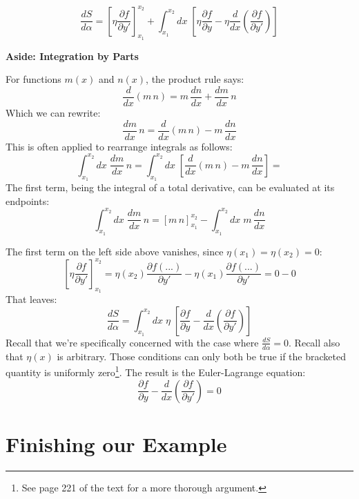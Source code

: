 \documentclass[10pt]{article}
\renewenvironment{quote}{\begin{shaded*}\begin{oldquote}}{\end{oldquote}\end{shaded*}}
\begin{document}
$$
\frac{dS}{d\alpha} = 
    \left[ \eta \frac{\partial f}{\partial y'} \right]_{x_1}^{x_2} + 
    \displaystyle\int_{x_1}^{x_2} dx \; \left[
    \eta \frac{\partial f}{\partial y} -
    \eta \frac{d}{dx} \left( \frac{\partial f}{\partial y'} \right) 
\right]
$$
\begin{quote}
    \textbf{Aside: Integration by Parts}
    
    For functions $m(x)$ and $n(x)$, the product rule says:
    $$
    \frac{d}{dx} \left( m \, n \right) = m \, \frac{dn}{dx} + \frac{dm}{dx} \, n
    $$
    Which we can rewrite:
    $$
    \frac{dm}{dx} \, n = 
    \frac{d}{dx} \left( m \, n \right) - m \, \frac{dn}{dx}
    $$
    This is often applied to rearrange integrals as follows:
    $$
    \displaystyle\int_{x_1}^{x_2} dx \; \frac{dm}{dx} \, n =
    \displaystyle\int_{x_1}^{x_2} dx \; \left[ \frac{d}{dx} \left( m \, n \right) - m \, \frac{dn}{dx} \right] =
    $$
    The first term, being the integral of a total derivative, can be evaluated at its endpoints:
    $$
    \displaystyle\int_{x_1}^{x_2} dx \; \frac{dm}{dx} \, n =
    \left[ m \, n \right]_{x_1}^{x_2} - 
    \displaystyle\int_{x_1}^{x_2} dx \; m \, \frac{dn}{dx}
    $$
\end{quote}
The first term on the left side above vanishes, since $\eta(x_1)=\eta(x_2)=0$:
$$
\left[ \eta \frac{\partial f}{\partial y'} \right]_{x_1}^{x_2} =
\eta(x_2) \frac{\partial f(...)}{\partial y'} - 
\eta(x_1) \frac{\partial f(...)}{\partial y'} = 
0 - 0
$$
That leaves:
$$
\frac{dS}{d\alpha} = \displaystyle\int_{x_1}^{x_2} dx \; \eta \; \left[
    \frac{\partial f}{\partial y} -
    \frac{d}{dx} \left( \frac{\partial f}{\partial y'} \right) 
\right]
$$
Recall that we're specifically concerned with the case where $\frac{dS}{d\alpha}=0$. Recall also that $\eta(x)$ is arbitrary. Those conditions can only both be true if the bracketed quantity is uniformly zero\footnote{See page 221 of the text for a more thorough argument.}. The result is the Euler-Lagrange equation:
$$
\frac{\partial f}{\partial y} -
\frac{d}{dx} \left( \frac{\partial f}{\partial y'} \right)
= 0
$$

\section*{Finishing our Example}
\end{document}
